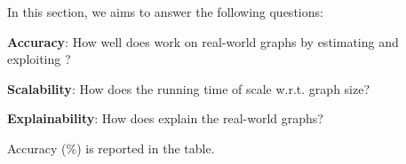 

In this section, we aims to answer the following questions:
\begin{compactenum}[{Q}1.]
\item {\bf Accuracy}: How well does \method work on real-world graphs by estimating and exploiting \nef?
\item {\bf Scalability}: How does the running time of \method scale w.r.t. graph size?
\item {\bf Explainability}: How does \method explain the real-world graphs?
\end{compactenum}

\begin{table*}[t]
\begin{minipage} {0.6\linewidth}
\setlength{\tabcolsep}{1pt}
\caption{\underline{} \underline{} Accuracy (\%) is reported in the table. \label{tab:ablation}}
\setlength\fboxsep{0pt}
\end{minipage} \hfill
\setlength{\tabcolsep}{1pt}
\begin{minipage} {0.38\linewidth}
\caption{\underline{} AWS total dollar amount (\$) is reported in the table. The  and  fonts denote running a single experiment by  and , respectively. 
}
\end{minipage}
\end{table*}
